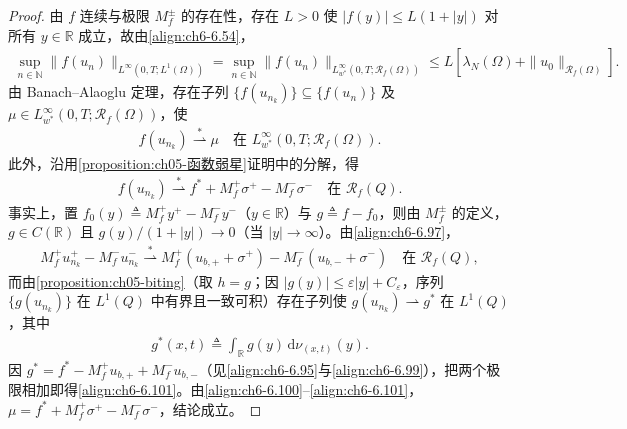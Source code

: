 \documentclass[../../main.tex]{subfiles}%
\begin{document}
\begin{proof}
由 $f$ 连续与极限 $M^\pm_f$ 的存在性，存在 $L>0$ 使 $|f(y)|\leqslant L(1+|y|)$ 对所有 $y\in\mathbb{R}$ 成立，故由\eqref{align:ch6-6.54}，
\begin{align*}
\sup_{n\in\mathbb{N}}\|f(u_n)\|_{L^\infty(0,T;L^1(\Omega))}
=\sup_{n\in\mathbb{N}}\|f(u_n)\|_{L^\infty_{w^*}(0,T;\mathscr{R}_f(\Omega))}
\leqslant L[\lambda_N(\Omega)+\|u_0\|_{\mathscr{R}_f(\Omega)}].
\end{align*}
由 Banach--Alaoglu 定理，存在子列 $\{f(u_{n_k})\}\subseteq\{f(u_n)\}$ 及 $\mu\in L^\infty_{w^*}(0,T;\mathscr{R}_f(\Omega))$，使
\begin{align}
f(u_{n_k})\stackrel{*}{\rightharpoonup}\mu
\quad\text{在 }L^\infty_{w^*}(0,T;\mathscr{R}_f(\Omega)). \label{align:ch6-6.100}
\end{align}
此外，沿用\cref{proposition:ch05-函数弱星}证明中的分解，得
\begin{align}
f(u_{n_k})\stackrel{*}{\rightharpoonup}f^*+M^+_f\sigma^+-M^-_f\sigma^-
\quad\text{在 }\mathscr{R}_f(Q). \label{align:ch6-6.101}
\end{align}
事实上，置 $f_0(y)\triangleq M^+_fy^+-M^-_fy^-$（$y\in\mathbb{R}$）与 $g\triangleq f-f_0$，则由 $M^\pm_f$ 的定义，$g\in C(\mathbb{R})$ 且 $g(y)/(1+|y|)\to0$（当 $|y|\to\infty$）。由\eqref{align:ch6-6.97}，
\begin{align*}
M^+_fu^+_{n_k}-M^-_fu^-_{n_k}\stackrel{*}{\rightharpoonup}M^+_f(u_{b,+}+\sigma^+)-M^-_f(u_{b,-}+\sigma^-)
\quad\text{在 }\mathscr{R}_f(Q),
\end{align*}
而由\cref{proposition:ch05-biting}（取 $h=g$；因 $|g(y)|\leqslant\varepsilon|y|+C_\varepsilon$，序列 $\{g(u_{n_k})\}$ 在 $L^1(Q)$ 中有界且一致可积）存在子列使 $g(u_{n_k})\rightharpoonup g^*$ 在 $L^1(Q)$，其中
\begin{align*}
g^*(x,t)\triangleq\int_\mathbb{R}g(y)\,\mathrm{d}\nu_{(x,t)}(y).
\end{align*}
因 $g^*=f^*-M^+_fu_{b,+}+M^-_fu_{b,-}$（见\eqref{align:ch6-6.95}与\eqref{align:ch6-6.99}），把两个极限相加即得\eqref{align:ch6-6.101}。由\eqref{align:ch6-6.100}--\eqref{align:ch6-6.101}，$\mu=f^*+M^+_f\sigma^+-M^-_f\sigma^-$，结论成立。
\end{proof}
\end{document}
